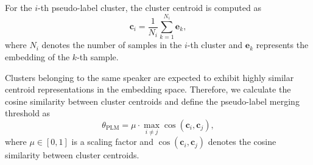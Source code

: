 \documentclass[lettersize,journal]{IEEEtran}
\begin{document}
For the $i$-th pseudo-label cluster, the cluster centroid is computed as
\begin{equation}
\mathbf{c}_i
=
\frac{1}{N_i}
\sum_{k=1}^{N_i}
\mathbf{e}_k,
\end{equation}
where $N_i$ denotes the number of samples in the $i$-th cluster and $\mathbf{e}_k$ represents the embedding of the $k$-th sample.

Clusters belonging to the same speaker are expected to exhibit highly similar centroid representations in the embedding space. Therefore, we calculate the cosine similarity between cluster centroids and define the pseudo-label merging threshold as
\begin{equation}
\theta_{\mathrm{PLM}}
=
\mu
\cdot
\max_{i\neq j}
\cos(\mathbf{c}_i,\mathbf{c}_j),
\end{equation}
where $\mu\in[0,1]$ is a scaling factor and $\cos(\mathbf{c}_i,\mathbf{c}_j)$ denotes the cosine similarity between cluster centroids.
\end{document}
